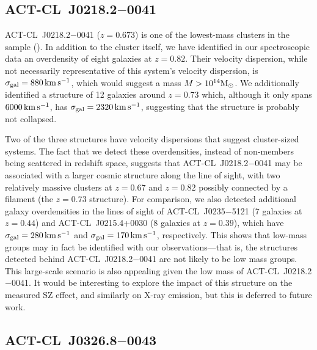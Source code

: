 \subsection{ACT-CL~J0218.2$-$0041}

ACT-CL~J0218.2$-$0041 ($z=0.673$) is one of the lowest-mass clusters in the sample 
(). In addition to the cluster itself, we have identified in our spectroscopic data 
an overdensity of eight galaxies at $z=0.82$. Their velocity dispersion, while not necessarily 
representative of this system's velocity dispersion, is $\sigma_{\rm 
gal}=880\,\mathrm{km\,s^{-1}}$, which would suggest a mass $M>10^{14}{\rm M}_\odot$. We additionally 
identified a structure of 12 galaxies around $z=0.73$ which, although it only spans 
$6000\,\mathrm{km\,s^{-1}}$, has $\sigma_{\rm gal}=2320\,\mathrm{km\,s^{-1}}$, suggesting that the 
structure is probably not collapsed.

Two of the three structures have velocity dispersions that suggest cluster-sized systems. The fact 
that we detect these overdensities, instead of non-members being scattered in redshift space, 
suggests that ACT-CL~J0218.2$-$0041 may be associated with a larger cosmic structure along the 
line of sight, with two relatively massive clusters at $z=0.67$ and $z=0.82$ possibly connected by 
a filament (the $z=0.73$ structure). For comparison, we also detected additional galaxy 
overdensities in the lines of sight of ACT-CL~J0235$-$5121 (7 galaxies at $z=0.44$) and 
ACT-CL~J0215.4+0030 (8 galaxies at $z=0.39$), which have $\sigma_{\rm 
gal}=280\,\mathrm{km\,s^{-1}}$ and $\sigma_{\rm gal}=170\,\mathrm{km\,s^{-1}}$, respectively. This 
shows that low-mass groups may in fact be identified with our observations---that is, the 
structures detected behind ACT-CL~J0218.2$-$0041 are not likely to be low mass groups. This 
large-scale scenario is also appealing given the low mass of ACT-CL~J0218.2$-$0041. It would be 
interesting to explore the impact of this structure on the measured SZ effect, and similarly on 
X-ray emission, but this is deferred to future work.

\subsection{ACT-CL~J0326.8$-$0043}

